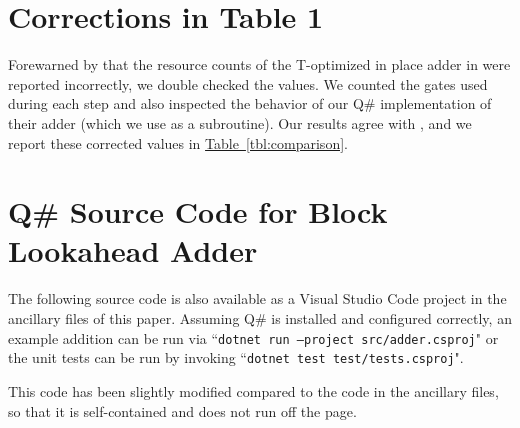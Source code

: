 \documentclass[onecolumn,unpublished]{quantumarticle}
\theoremstyle{definition}
\theoremstyle{definition}
\theoremstyle{definition}
\newcommand{\tbl}[1]{\hyperref[tbl:#1]{Table~\ref*{tbl:#1}}}
\begin{document}



\appendix

\section{Corrections in Table 1}
\label{app:correction}

Forewarned by \cite{oonishi2020efficient} that the resource counts of the T-optimized in place adder in \cite{thapliyal2020lookahead} were reported incorrectly, we double checked the values.
We counted the gates used during each step and also inspected the behavior of our Q\# implementation of their adder (which we use as a subroutine).
Our results agree with \cite{oonishi2020efficient}, and we report these corrected values in \tbl{comparison}.

\section{Q\# Source Code for Block Lookahead Adder}
\label{app:blockadder}

The following source code is also available as a Visual Studio Code project in the ancillary files of this paper.
Assuming Q\# is installed and configured correctly, an example addition can be run via ``\texttt{dotnet run --project src/adder.csproj}" or the unit tests can be run by invoking ``\texttt{dotnet test test/tests.csproj}".

This code has been slightly modified compared to the code in the ancillary files, so that it is self-contained and does not run off the page.
\end{document}
